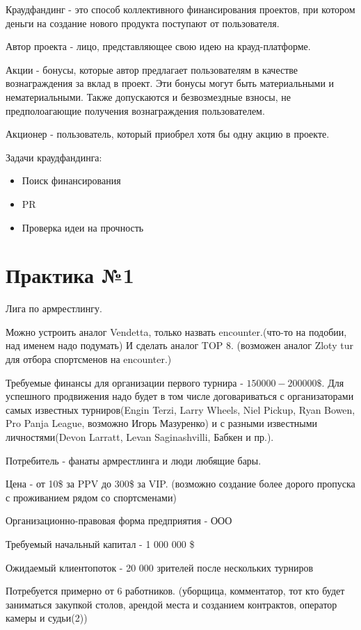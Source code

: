 \documentclass[a4paper, 12pt]{article}
\begin{document}
	Краудфандинг - это способ коллективного финансирования проектов, при котором деньги на создание нового продукта поступают от пользователя.
	
	Автор проекта - лицо, представляющее свою идею на крауд-платформе.
	
	Акции - бонусы, которые автор предлагает пользователям в качестве вознаграждения за вклад в проект. Эти бонусы могут быть материальными и нематериальными. Также допускаются и безвозмездные взносы, не предполоагающие получения вознаграждения пользователем.
	
	Акционер - пользователь, который приобрел хотя бы одну акцию в проекте.
	
	Задачи краудфандинга:
	\begin{itemize}
		\item Поиск финансирования
		\item PR
		\item Проверка идеи на прочность
	\end{itemize}
	
	\part*{Практика №1}
	
	Лига по армрестлингу. 
	
	Можно устроить аналог Vendetta, только назвать encounter.(что-то на подобии, над именем надо подумать) И сделать аналог TOP 8. (возможен аналог Zloty tur для отбора спортсменов на encounter.)
	
	Требуемые финансы для организации первого турнира - $150 000 - 200 000 \$$. Для успешного продвижения надо будет в том числе договариваться с организаторами самых известных турниров(Engin Terzi, Larry Wheels, Niel Pickup, Ryan Bowen, Pro Panja League, возможно Игорь Мазуренко) и с разными известными личностями(Devon Larratt, Levan Saginashvilli, Бабкен и пр.). 
	
	Потребитель - фанаты армрестлинга и люди любящие бары.
	
	Цена - от 10\$ за PPV до 300\$ за VIP. (возможно создание более дорого пропуска с проживанием рядом со спортсменами)
	
	Организационно-правовая форма предприятия - ООО
	
	Требуемый начальный капитал - 1 000 000 \$
	
	Ожидаемый клиентопоток - 20 000 зрителей после нескольких турниров
	
	Потребуется примерно от 6 работников. (уборщица, комментатор, тот кто будет заниматься закупкой столов, арендой места и созданием контрактов, оператор камеры и судьи(2))
	
\end{document}
